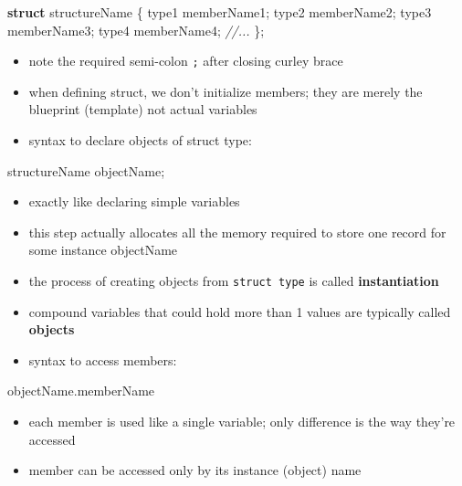 \documentclass[11pt]{article}
\providecommand{\tightlist}{%
      \setlength{\itemsep}{0pt}\setlength{\parskip}{0pt}}
\newenvironment{Shaded}{}{}
\newcommand{\KeywordTok}[1]{\textcolor[rgb]{0.00,0.44,0.13}{\textbf{{#1}}}}
\newcommand{\CommentTok}[1]{\textcolor[rgb]{0.38,0.63,0.69}{\textit{{#1}}}}
\newcommand{\NormalTok}[1]{{#1}}
\newcommand{\OperatorTok}[1]{\textcolor[rgb]{0.40,0.40,0.40}{{#1}}}
\begin{document}
\begin{Shaded}
\begin{Highlighting}[]
\KeywordTok{struct}\NormalTok{ structureName }\OperatorTok{\{}
\NormalTok{    type1 memberName1}\OperatorTok{;}
\NormalTok{    type2 memberName2}\OperatorTok{;}
\NormalTok{    type3 memberName3}\OperatorTok{;}
\NormalTok{    type4 memberName4}\OperatorTok{;}
    \CommentTok{//...}
\OperatorTok{\};}
\end{Highlighting}
\end{Shaded}

\begin{itemize}
\item
  note the required semi-colon \texttt{;} after closing curley brace
\item
  when defining struct, we don't initialize members; they are merely the
  blueprint (template) not actual variables
\item
  syntax to declare objects of struct type:
\end{itemize}

\begin{Shaded}
\begin{Highlighting}[]
\NormalTok{structureName objectName}\OperatorTok{;}
\end{Highlighting}
\end{Shaded}

\begin{itemize}
\item
  exactly like declaring simple variables
\item
  this step actually allocates all the memory required to store one
  record for some instance objectName
\item
  the process of creating objects from \texttt{struct\ type} is called
  \textbf{instantiation}
\item
  compound variables that could hold more than 1 values are typically
  called \textbf{objects}
\item
  syntax to access members:
\end{itemize}

\begin{Shaded}
\begin{Highlighting}[]
\NormalTok{objectName}\OperatorTok{.}\NormalTok{memberName}
\end{Highlighting}
\end{Shaded}

\begin{itemize}
\tightlist
\item
  each member is used like a single variable; only difference is the way
  they're accessed
\item
  member can be accessed only by its instance (object) name
\end{itemize}
\end{document}
